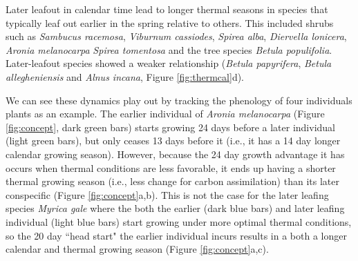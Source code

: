 \documentclass{article}[12pt]
\begin{document}
Later leafout in calendar time lead to longer thermal seasons in species that typically leaf out earlier in the spring relative to others. This included shrubs such as \emph{Sambucus racemosa}, \emph{Viburnum cassiodes}, \emph{Spirea alba}, \emph{Diervella lonicera}, \emph{Aronia melanocarpa} \emph{Spirea tomentosa} and the tree species \emph{Betula populifolia}. Later-leafout species showed a weaker relationship (\emph{Betula papyrifera}, \emph{Betula allegheniensis} and \emph{Alnus incana}, Figure \ref{fig:thermcal}d). 

We can see these dynamics play out by tracking the phenology of four individuals plants as an example. The earlier individual of \emph{Aronia melanocarpa} (Figure \ref{fig:concept}, dark green bars) starts growing 24 days before a later individual (light green bars), but only ceases 13 days before it (i.e., it has a 14 day longer calendar growing season). However, because the 24 day growth advantage it has occurs when thermal conditions are less favorable, it ends up having a shorter thermal growing season (i.e., less change for carbon assimilation) than its later conspecific (Figure \ref{fig:concept}a,b). This is not the case for the later leafing species \emph{Myrica gale} where the both the earlier (dark blue bars) and later leafing individual (light blue bars) start growing under more optimal thermal conditions, so the 20 day ``head start" the earlier individual incurs results in a both a longer calendar and thermal growing season (Figure \ref{fig:concept}a,c). 
\end{document}
